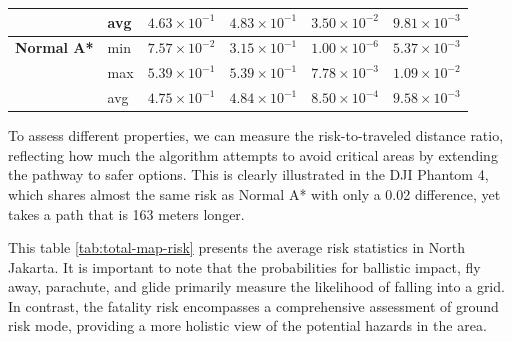 \documentclass[12pt]{report}
\begin{document}
\begin{table}[H]
\begin{tabular}{|l l l l l l |}
                                        & avg & \(4.63 \times 10^{-1}\) & \(4.83 \times 10^{-1}\) & \(3.50 \times 10^{-2}\) & \(9.81 \times 10^{-3}\) \\
                \hline
                \textbf{Normal A*} & min & \(7.57 \times 10^{-2}\) & \(3.15 \times 10^{-1}\) & \(1.00 \times 10^{-6}\) & \(5.37 \times 10^{-3}\) \\
                                   & max & \(5.39 \times 10^{-1}\) & \(5.39 \times 10^{-1}\) & \(7.78 \times 10^{-3}\) & \(1.09 \times 10^{-2}\) \\
                                   & avg & \(4.75 \times 10^{-1}\) & \(4.84 \times 10^{-1}\) & \(8.50 \times 10^{-4}\) & \(9.58 \times 10^{-3}\) \\
                \hline
            \end{tabular}
            \captionsetup{justification=justified} %
            \label{tab:pathway-risk}
        \end{table}
            
            
        To assess different properties, we can measure the risk-to-traveled distance ratio, reflecting how much the
        algorithm attempts to avoid critical areas by extending the pathway to safer options. This is clearly
        illustrated in the DJI Phantom 4, which shares almost the same risk as Normal A* with only a 0.02 difference,
        yet takes a path that is 163 meters longer.

        This table \ref{tab:total-map-risk} presents the average risk statistics in North Jakarta. It is
        important to note that the probabilities for ballistic impact, fly away, parachute, and glide primarily measure the
        likelihood of falling into a grid. In contrast, the fatality risk encompasses a comprehensive assessment of ground
        risk mode, providing a more holistic view of the potential hazards in the area.
\end{document}
